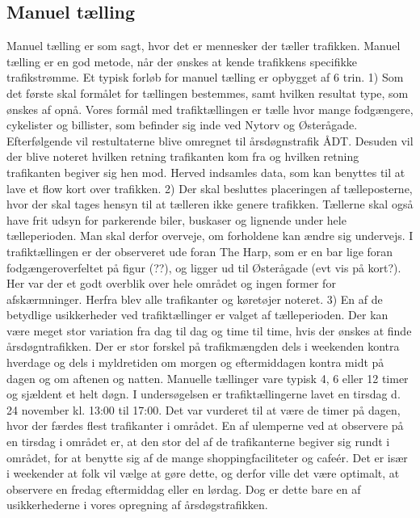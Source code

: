 \subsection{Manuel tælling}
\label{sub:manuel_taelling}
Manuel tælling er som sagt, hvor det er mennesker der tæller trafikken. Manuel tælling er en god metode, når der ønskes at kende trafikkens specifikke trafikstrømme. Et typisk forløb for manuel tælling er opbygget af 6 trin.
1) Som det første skal formålet for tællingen bestemmes, samt hvilken resultat type, som ønskes af opnå.
Vores formål med trafiktællingen er tælle hvor mange fodgængere, cykelister og billister, som befinder sig inde ved Nytorv og Østerågade. Efterfølgende vil restultaterne blive omregnet  til årsdøgnstrafik ÅDT. Desuden vil der blive noteret hvilken retning trafikanten kom fra og hvilken retning trafikanten begiver sig hen mod. Herved indsamles data, som kan benyttes til at lave et flow kort over trafikken.
2) Der skal besluttes placeringen af tælleposterne, hvor der skal tages hensyn til at tælleren ikke genere trafikken. Tællerne skal også have frit udsyn for parkerende biler, buskaser og lignende under hele tælleperioden. Man skal derfor overveje, om forholdene kan ændre sig undervejs. I trafiktællingen er der observeret ude foran The Harp, som er en bar lige foran fodgængeroverfeltet på figur (??), og ligger ud til Østerågade (evt vis på kort?). Her var der et godt overblik over hele området og ingen former for afskærmninger. Herfra blev alle trafikanter og køretøjer noteret.
3) En af de betydlige usikkerheder ved trafiktællinger er valget af tælleperioden. Der kan være meget stor variation fra dag til dag og time til time, hvis der ønskes at finde årsdøgntrafikken. Der er stor forskel på trafikmængden dels i weekenden kontra hverdage og dels i myldretiden om morgen og eftermiddagen kontra midt på dagen og om aftenen og natten. Manuelle tællinger vare typisk 4, 6 eller 12 timer og sjældent et helt døgn. I undersøgelsen er trafiktællingerne lavet en tirsdag d. 24 november kl. 13:00 til 17:00. Det var vurderet til at være de timer på dagen, hvor der færdes flest trafikanter i området. En af ulemperne ved at observere på en tirsdag i området er, at den stor del af de trafikanterne begiver sig rundt i området, for at benytte sig af de mange shoppingfaciliteter og cafeér. Det er især i weekender at folk vil vælge at gøre dette, og derfor ville det være optimalt, at observere en fredag eftermiddag eller en lørdag. Dog er dette bare en af usikkerhederne i vores opregning af årsdøgstrafikken.
